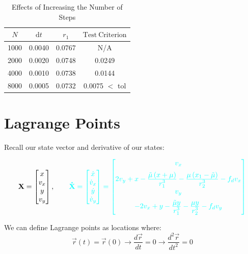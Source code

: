\documentclass{article}
\newcommand{\cw}{\color{white}}
\newcommand{\deriv}[2]{\frac{d#1}{d#2}}
\newcommand{\ddfrac}[2]{\frac{\displaystyle #1}{\displaystyle #2}}
\begin{document}
\begin{table}[h]
  \centering
  \caption{\cw Effects of Increasing the Number of Steps}
  \begin{tabular}{cccc} \toprule
      {$N$} & {$\mathrm{d}t$} & {$r_1$} & {$\mathrm{Test \ Criterion}$} \\ \midrule
      1000  & 0.0040 & 0.0767 & N/A    \\
      2000  & 0.0020 & 0.0748 & 0.0249 \\
      4000  & 0.0010 & 0.0738 & 0.0144 \\
      8000  & 0.0005 & 0.0732 & \color{magenta} 0.0075 \cw $<$ tol \\ \bottomrule
  \end{tabular}
  \label{tab:table2}
\end{table}

\pagebreak

\section{Lagrange Points}

Recall our state vector and derivative of our states:

\begin{equation*}
    \bf{X}
    = \begin{bmatrix}
         x \\
         v_x \\
         y \\
         v_y
       \end{bmatrix},
    \qquad \color{cyan} \dot{\bf{X}} = 
    \begin{bmatrix}
        \dot{x} \\
        \dot{v}_x \\
        \dot{y} \\
        \dot{v}_y
    \end{bmatrix}
    = 
    \begin{bmatrix}
        v_x \\[0.2cm]
        2v_y + x - \ddfrac{\tilde{\mu} \left(x+\mu\right)}{r_1^3} - \ddfrac{\mu \left(x_1-\tilde{\mu}\right)}{r_2^3} - f_d v_x \\[0.2cm]
        v_y \\[0.2cm]
        -2v_x + y - \ddfrac{\tilde{\mu}y}{r_1^3} - \ddfrac{\mu y}{r_2^3} - f_d v_y
    \end{bmatrix}
  \end{equation*}

We can define Lagrange points as locations where:
\begin{equation*}
    \vec{r}(t) = \vec{r}(0) \rightarrow \deriv{\vec{r}}{t} = 0 \rightarrow \deriv{^2\vec{r}}{t^2} = 0
\end{equation*}
\end{document}

